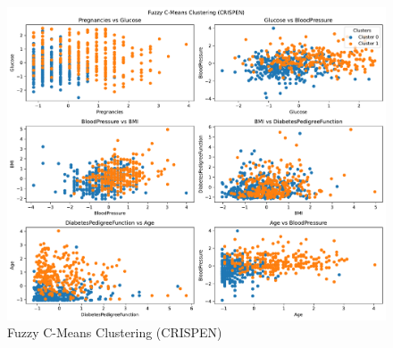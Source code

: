 \begin{figure}[h!]
    \centering
    \includegraphics[width=1\textwidth]{Plots/Fuzzy C-Means Clustering (CRISPEN) CLF.pdf}
    \caption{Fuzzy C-Means Clustering (CRISPEN)}
    \label{fig:my_label}
\end{figure}